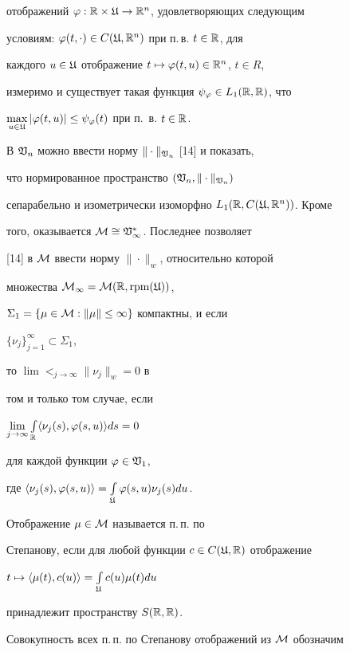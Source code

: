 отображений $\varphi:\Bbb R\times\frak U\to\Bbb R^{n}$, удовлетворяющих следующим


условиям: $\varphi(t,\cdot)\in C(\frak U,\Bbb R^n)$ при п.\,в. $t\in \Bbb R$, для


каждого $u\in\frak U$ отображение $t\mapsto \varphi(t,u)\in\Bbb R^n$, $t\in R$,


измеримо и существует такая функция $\psi_{\varphi}\in L_{1}(\Bbb R,\Bbb R)$, что


$\max\limits_{u\in\frak U}|\varphi(t,u)|\le\psi_{\varphi}(t)$ при п.~в. $t\in\Bbb R$.


В $\frak V_{n}$ можно ввести норму $\|\cdot\|_{\frak V_{n}}$ [14] и показать,


что нормированное пространство $(\frak V_{n},\|\cdot\|_{\frak V_{n}})$


сепарабельно и изометрически изоморфно $L_{1}(\Bbb R,C(\frak U,\Bbb R^{n}))$. Кроме


того, оказывается $\cal M\cong\frak V_{1}^{*}$. Последнее позволяет


[14] в $\cal M$ ввести норму $\|\cdot\|_{w}$, относительно которой


множества $\cal M_{1}=\cal M(\Bbb R,\operatorname{rpm}(\frak U))$,


$\Sigma_{1}=\{\mu\in\cal M:\|\mu\|\le 1\}$ компактны, и если


$\{\nu_{j}\}_{j=1}^{\infty}\subset \Sigma_{1}$,


то $\lim\lt_{j\to\infty}\|\nu_{j}\|_{w}=0$ в


том и только том случае, если


$\lim\limits_{j\to\infty}\int\limits_{\Bbb R}\langle\nu_{j}(s),\varphi(s,u)\rangle ds=0$


для каждой функции $\varphi\in\frak V_{1}$,


где $\langle\nu_{j}(s),\varphi(s,u)\rangle=\int\limits_{\frak U}\varphi(s,u)\nu_{j}(s)du$.





\begin{defns}


Отображение $\mu\in\cal M$ называется п.\,п. по


Степанову, если для любой функции $c\in C(\frak U,\Bbb R)$ отображение


$t\mapsto\langle\mu(t),c(u)\rangle=\int\limits_{\frak U}c(u)\mu(t)du$


принадлежит пространству $S(\Bbb R,\Bbb R)$.


\end{defns}





Совокупность всех п.\,п. по Степанову отображений из $\cal M$ обозначим


